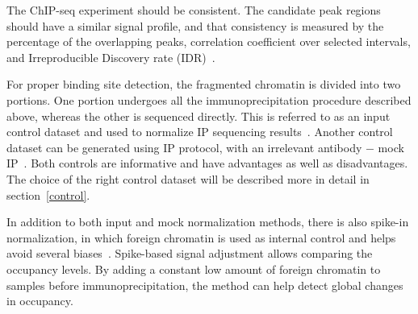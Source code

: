 The ChIP-seq experiment should be consistent. 
The candidate peak regions should have a similar signal profile, and that consistency is measured by the percentage of the overlapping peaks, correlation coefficient over selected intervals, and Irreproducible Discovery rate (IDR)~\cite{shin2013computational}.

For proper binding site detection, the fragmented chromatin is divided into two portions. 
One portion undergoes all the immunoprecipitation procedure described above, whereas the other is sequenced directly. 
This is referred to as an input control dataset and used to normalize IP sequencing results~\cite{kidder2011chip}. 
Another control dataset can be generated using IP protocol, with an irrelevant antibody $-$ mock IP~\cite{flensburg2014comparison}. 
Both controls are informative and have advantages as well as disadvantages.
The choice of the right control dataset will be described more in detail in section~\ref{control}.

In addition to both input and mock normalization methods, there is also spike-in normalization, in which foreign chromatin is used as internal control and helps avoid several biases~\cite{bonhoure2014quantifying}.
Spike-based signal adjustment allows comparing the occupancy levels. 
By adding a constant low amount of foreign chromatin to samples before immunoprecipitation, the method can help detect global changes in occupancy. 